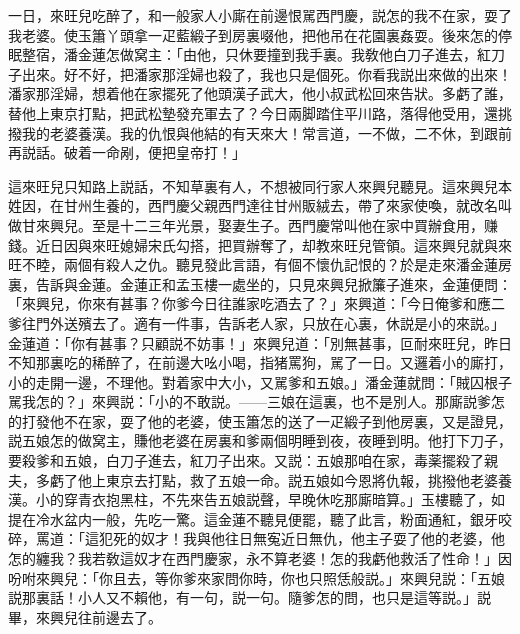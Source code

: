 一日，來旺兒吃醉了，和一般家人小廝在前邊恨駡西門慶，説怎的我不在家，耍了我老婆。使玉簫丫頭拿一疋藍緞子到房裏啜他，把他吊在花園裏姦耍。後來怎的停眠整宿，潘金蓮怎做窝主：「由他，只休要撞到我手裏。我敎他白刀子進去，紅刀子出來。好不好，把潘家那淫婦也殺了，我也只是個死。你看我説出來做的出來！潘家那淫婦，想着他在家擺死了他頭漢子武大，他小叔武松回來告狀。多虧了誰，替他上東京打點，把武松墊發充軍去了？今日兩脚踏住平川路，落得他受用，還挑撥我的老婆養漢。我的仇恨與他結的有天來大！常言道，一不做，二不休，到跟前再説話。破着一命剐，便把皇帝打！」

這來旺兒只知路上説話，不知草裏有人，不想被同行家人來興兒聽見。這來興兒本姓因，在甘州生養的，西門慶父親西門達往甘州販絨去，帶了來家使喚，就改名叫做甘來興兒。至是十二三年光景，娶妻生子。西門慶常叫他在家中買辦食用，赚錢。近日因與來旺媳婦宋氏勾搭，把買辦奪了，却教來旺兒管領。這來興兒就與來旺不睦，兩個有殺人之仇。聽見發此言語，有個不懷仇記恨的？於是走來潘金蓮房裏，告訴與金蓮。金蓮正和孟玉樓一處坐的，只見來興兒掀簾子進來，金蓮便問：「來興兒，你來有甚事？你爹今日往誰家吃酒去了？」來興道：「今日俺爹和應二爹往門外送殯去了。適有一件事，告訴老人家，只放在心裏，休説是小的來説。」金蓮道：「你有甚事？只顧説不妨事！」來興兒道：「別無甚事，叵耐來旺兒，昨日不知那裏吃的稀醉了，在前邊大吆小喝，指猪罵狗，駡了一日。又邏着小的廝打，小的走開一邊，不理他。對着家中大小，又駡爹和五娘。」潘金蓮就問：「賊囚根子駡我怎的？」來興説：「小的不敢説。——三娘在這裏，也不是別人。那廝説爹怎的打發他不在家，耍了他的老婆，使玉簫怎的送了一疋緞子到他房裏，又是證見，説五娘怎的做窝主，賺他老婆在房裏和爹兩個明睡到夜，夜睡到明。他打下刀子，要殺爹和五娘，白刀子進去，紅刀子出來。又説：五娘那咱在家，毒薬擺殺了親夫，多虧了他上東京去打點，救了五娘一命。説五娘如今恩將仇報，挑撥他老婆養漢。小的穿青衣抱黑柱，不先來告五娘説聲，早晚休吃那廝暗算。」玉樓聽了，如提在冷水盆内一般，先吃一驚。這金蓮不聽見便罷，聽了此言，粉面通紅，銀牙咬碎，罵道：「這犯死的奴才！我與他往日無寃近日無仇，他主子耍了他的老婆，他怎的纏我？我若敎這奴才在西門慶家，永不算老婆！怎的我虧他救活了性命！」因吩咐來興兒：「你且去，等你爹來家問你時，你也只照恁般説。」來興兒説：「五娘説那裏話！小人又不賴他，有一句，説一句。隨爹怎的問，也只是這等説。」説畢，來興兒往前邊去了。

